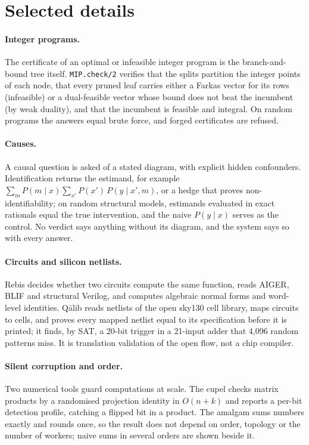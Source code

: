 \section{Selected details}

\paragraph{Integer programs.} The certificate of an optimal or infeasible integer program is the
branch-and-bound tree itself. \texttt{MIP.check/2} verifies that the splits partition the integer points
of each node, that every pruned leaf carries either a Farkas vector for its rows (infeasible) or a
dual-feasible vector whose bound does not beat the incumbent (by weak duality), and that the incumbent is
feasible and integral. On random programs the answers equal brute force, and forged certificates are
refused.

\paragraph{Causes.} A causal question is asked of a stated diagram, with explicit hidden confounders.
Identification returns the estimand, for example $\sum_m P(m \mid x)\sum_{x'} P(x')\,P(y \mid x', m)$, or a
hedge that proves non-identifiability; on random structural models, estimands evaluated in exact
rationals equal the true intervention, and the naive $P(y\mid x)$ serves as the control. No verdict says
anything without its diagram, and the system says so with every answer.

\paragraph{Circuits and silicon netlists.} Rebis decides whether two circuits compute the same function,
reads AIGER, BLIF and structural Verilog, and computes algebraic normal forms and word-level identities.
Qālib reads netlists of the open sky130 cell library, maps circuits to cells, and proves every mapped
netlist equal to its specification before it is printed; it finds, by SAT, a 20-bit trigger in a 21-input
adder that 4{,}096 random patterns miss. It is translation validation of the open flow, not a chip
compiler.

\paragraph{Silent corruption and order.} Two numerical tools guard computations at scale. The cupel
checks matrix products by a randomised projection identity in $O(n+k)$ and reports a per-bit detection
profile, catching a flipped bit in a product. The amalgam sums numbers exactly and rounds once, so the
result does not depend on order, topology or the number of workers; naive sums in several orders are
shown beside it.


